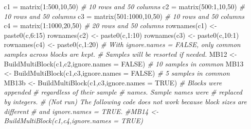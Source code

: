 \documentclass[
]{book}
\newenvironment{Shaded}{\begin{snugshade}}{\end{snugshade}}
\newcommand{\AttributeTok}[1]{\textcolor[rgb]{0.77,0.63,0.00}{#1}}
\newcommand{\CommentTok}[1]{\textcolor[rgb]{0.56,0.35,0.01}{\textit{#1}}}
\newcommand{\ConstantTok}[1]{\textcolor[rgb]{0.00,0.00,0.00}{#1}}
\newcommand{\DecValTok}[1]{\textcolor[rgb]{0.00,0.00,0.81}{#1}}
\newcommand{\FunctionTok}[1]{\textcolor[rgb]{0.00,0.00,0.00}{#1}}
\newcommand{\NormalTok}[1]{#1}
\newcommand{\OtherTok}[1]{\textcolor[rgb]{0.56,0.35,0.01}{#1}}
\newcommand{\SpecialCharTok}[1]{\textcolor[rgb]{0.00,0.00,0.00}{#1}}
\newcommand{\StringTok}[1]{\textcolor[rgb]{0.31,0.60,0.02}{#1}}
\begin{document}
\begin{Shaded}
\begin{Highlighting}[]
\NormalTok{c1 }\OtherTok{=} \FunctionTok{matrix}\NormalTok{(}\DecValTok{1}\SpecialCharTok{:}\DecValTok{500}\NormalTok{,}\DecValTok{10}\NormalTok{,}\DecValTok{50}\NormalTok{) }\CommentTok{\# 10 rows and 50 columns}
\NormalTok{c2 }\OtherTok{=} \FunctionTok{matrix}\NormalTok{(}\DecValTok{500}\SpecialCharTok{:}\DecValTok{1}\NormalTok{,}\DecValTok{10}\NormalTok{,}\DecValTok{50}\NormalTok{) }\CommentTok{\# 10 rows and 50 columns}
\NormalTok{c3 }\OtherTok{=} \FunctionTok{matrix}\NormalTok{(}\DecValTok{501}\SpecialCharTok{:}\DecValTok{1000}\NormalTok{,}\DecValTok{10}\NormalTok{,}\DecValTok{50}\NormalTok{) }\CommentTok{\# 10 rows and 50 columns}
\NormalTok{c4 }\OtherTok{=} \FunctionTok{matrix}\NormalTok{(}\DecValTok{1}\SpecialCharTok{:}\DecValTok{1000}\NormalTok{,}\DecValTok{20}\NormalTok{,}\DecValTok{50}\NormalTok{) }\CommentTok{\# 20 rows and 50 columns}
\FunctionTok{rownames}\NormalTok{(c1) }\OtherTok{\textless{}{-}} \FunctionTok{paste0}\NormalTok{(}\StringTok{\textquotesingle{}c\textquotesingle{}}\NormalTok{,}\DecValTok{6}\SpecialCharTok{:}\DecValTok{15}\NormalTok{)}
\FunctionTok{rownames}\NormalTok{(c2) }\OtherTok{\textless{}{-}} \FunctionTok{paste0}\NormalTok{(}\StringTok{\textquotesingle{}c\textquotesingle{}}\NormalTok{,}\DecValTok{1}\SpecialCharTok{:}\DecValTok{10}\NormalTok{)}
\FunctionTok{rownames}\NormalTok{(c3) }\OtherTok{\textless{}{-}} \FunctionTok{paste0}\NormalTok{(}\StringTok{\textquotesingle{}c\textquotesingle{}}\NormalTok{,}\DecValTok{10}\SpecialCharTok{:}\DecValTok{1}\NormalTok{)}
\FunctionTok{rownames}\NormalTok{(c4) }\OtherTok{\textless{}{-}} \FunctionTok{paste0}\NormalTok{(}\StringTok{\textquotesingle{}c\textquotesingle{}}\NormalTok{,}\DecValTok{1}\SpecialCharTok{:}\DecValTok{20}\NormalTok{)}
\CommentTok{\# With ignore.names = FALSE, only common samples across blocks are kept.}
\CommentTok{\# Samples will be resorted if needed.}
\NormalTok{MB12 }\OtherTok{\textless{}{-}} \FunctionTok{BuildMultiBlock}\NormalTok{(c1,c2,}\AttributeTok{ignore.names =} \ConstantTok{FALSE}\NormalTok{) }\CommentTok{\# 10 samples in common}
\NormalTok{MB13 }\OtherTok{\textless{}{-}} \FunctionTok{BuildMultiBlock}\NormalTok{(c1,c3,}\AttributeTok{ignore.names =} \ConstantTok{FALSE}\NormalTok{) }\CommentTok{\# 5 samples in common}
\NormalTok{MB13b }\OtherTok{\textless{}{-}} \FunctionTok{BuildMultiBlock}\NormalTok{(c1,c3,}\AttributeTok{ignore.names =} \ConstantTok{TRUE}\NormalTok{) }\CommentTok{\# Blocks were appended}
                                                    \CommentTok{\# regardless of their sample}
                                                    \CommentTok{\# names. Sample names were}
                                                    \CommentTok{\# replaced by integers.}
\CommentTok{\# (Not run) The following code does not work because block sizes are different}
\CommentTok{\# and ignore.names = TRUE.}
\CommentTok{\#MB14 \textless{}{-} BuildMultiBlock(c1,c4,ignore.names = TRUE)}
\end{Highlighting}
\end{Shaded}
\end{document}
